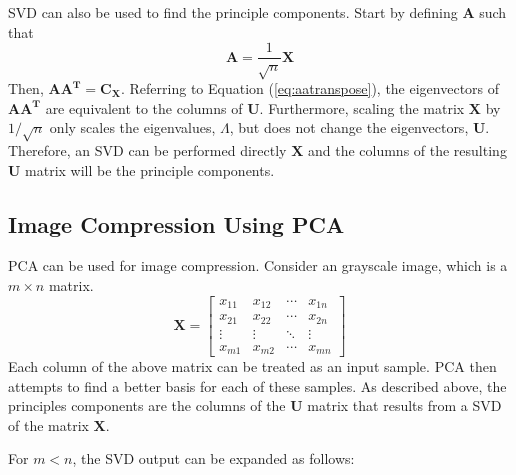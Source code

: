 \documentclass[conference]{IEEEtran}
\begin{document}
	SVD can also be used to find the principle components. Start by defining $\mathbf{A}$ such that
	\begin{equation*}
		\mathbf{A} = \frac{1}{\sqrt{n}}\mathbf{X}
	\end{equation*}
	Then, $\mathbf{AA^T} = \mathbf{C_X}$. Referring to Equation (\ref{eq:aatranspose}), the eigenvectors of $\mathbf{AA^T}$ are equivalent to the columns of $\mathbf{U}$. Furthermore, scaling the matrix $\mathbf{X}$ by $1/\sqrt{n}$ only scales the eigenvalues, $\Lambda$, but does not change the eigenvectors, $\mathbf{U}$. Therefore, an SVD can be performed directly $\mathbf{X}$ and the columns of the resulting $\mathbf{U}$ matrix will be the principle components.
    
    \subsection{Image Compression Using PCA} \label{pca_section}
    	
    	PCA can be used for image compression. Consider an grayscale image, which is a $m \times n$ matrix. 
    	\begin{equation}
    		\mathbf{X} = \begin{bmatrix}
    			x_{11} & x_{12} & \cdots & x_{1n} \\
    			x_{21} & x_{22} & \cdots & x_{2n} \\
    			\vdots & \vdots & \ddots & \vdots \\
    			x_{m1} & x_{m2} & \cdots & x_{mn}
    		\end{bmatrix}    			
    	\end{equation}
    	Each column of the above matrix can be treated as an input sample. PCA then attempts to find a better basis for each of these samples. As described above, the principles components are the columns of the $\mathbf{U}$ matrix that results from a SVD of the matrix $\mathbf{X}$.
	
	For $m < n$, the SVD output can be expanded as follows:
	
\end{document}
